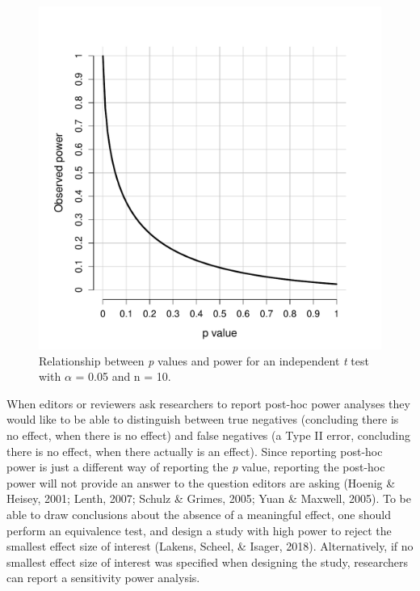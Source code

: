 \documentclass[
  english,
  ,jou, a4paper,floatsintext]{apa6}
\begin{document}
\begin{figure}
\centering
\includegraphics{sample_size_justification_files/figure-latex/obs-power-plot-2-1.pdf}
\caption{\label{fig:obs-power-plot-2}Relationship between \emph{p} values and power for an independent \emph{t} test with \(\alpha\) = 0.05 and n = 10.}
\end{figure}

When editors or reviewers ask researchers to report post-hoc power analyses they would like to be able to distinguish between true negatives (concluding there is no effect, when there is no effect) and false negatives (a Type II error, concluding there is no effect, when there actually is an effect). Since reporting post-hoc power is just a different way of reporting the \emph{p} value, reporting the post-hoc power will not provide an answer to the question editors are asking (Hoenig \& Heisey, 2001; Lenth, 2007; Schulz \& Grimes, 2005; Yuan \& Maxwell, 2005). To be able to draw conclusions about the absence of a meaningful effect, one should perform an equivalence test, and design a study with high power to reject the smallest effect size of interest (Lakens, Scheel, \& Isager, 2018). Alternatively, if no smallest effect size of interest was specified when designing the study, researchers can report a sensitivity power analysis.
\end{document}
